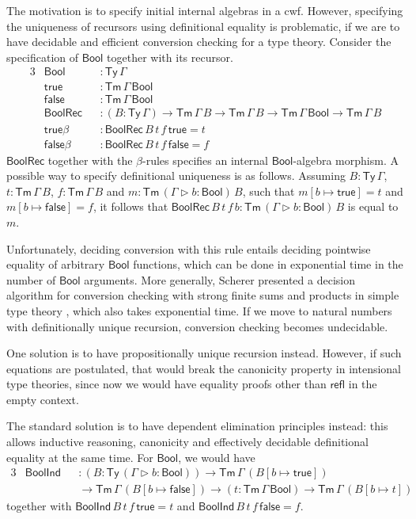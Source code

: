 \documentclass[12pt,a4paper,twoside,openany]{book}
\theoremstyle{remark}
\theoremstyle{definition}
\theoremstyle{theorem}
\newcommand{\ms}[1]{\mathsf{#1}}
\newcommand{\refl}{\mathsf{refl}}
\newcommand{\Tm}{\mathsf{Tm}}
\newcommand{\Ty}{\mathsf{Ty}}
\newcommand{\ext}{\triangleright}
\newcommand{\Bool}{\ms{Bool}}
\newcommand{\true}{\ms{true}}
\newcommand{\false}{\ms{false}}
\begin{document}
The motivation is to specify initial internal algebras in a cwf. However,
specifying the uniqueness of recursors using definitional equality is
problematic, if we are to have decidable and efficient conversion checking for a
type theory. Consider the specification of $\Bool$ together with its recursor.
\begin{alignat*}{3}
  & \Bool  &&: \Ty\,\Gamma \\
  & \true  &&: \Tm\,\Gamma\,\Bool \\
  & \false &&: \Tm\,\Gamma\,\Bool \\
  & \ms{BoolRec} &&: (B : \Ty\,\Gamma)\to \Tm\,\Gamma\,B \to \Tm\,\Gamma\,B \to \Tm\,\Gamma\,\Bool \to \Tm\,\Gamma\,B\\
  & \true\beta &&: \ms{BoolRec}\,B\,t\,f\,\true = t\\
  & \false\beta &&: \ms{BoolRec}\,B\,t\,f\,\false = f
\end{alignat*}
$\ms{BoolRec}$ together with the $\beta$-rules specifies an internal
$\Bool$-algebra morphism. A possible way to specify definitional uniqueness is
as follows. Assuming $B : \Ty\,\Gamma$, $t : \Tm\,\Gamma\,B$, $f :
\Tm\,\Gamma\,B$ and $m : \Tm\,(\Gamma\ext b : \Bool)\,B$, such that $m[b \mapsto
  \true] = t$ and $m[b \mapsto \false] = f$, it follows that
$\ms{BoolRec}\,B\,t\,f\,b : \Tm\,(\Gamma\ext b : \Bool)\,B$ is equal to $m$.

Unfortunately, deciding conversion with this rule entails deciding pointwise
equality of arbitrary $\Bool$ functions, which can be done in exponential time
in the number of $\Bool$ arguments. More generally, Scherer presented a decision
algorithm for conversion checking with strong finite sums and products in simple
type theory \cite{scherer17deciding}, which also takes exponential time. If we
move to natural numbers with definitionally unique recursion, conversion
checking becomes undecidable.

One solution is to have propositionally unique recursion instead. However, if
such equations are postulated, that would break the canonicity property in
intensional type theories, since now we would have equality proofs other than
$\refl$ in the empty context.

The standard solution is to have dependent elimination principles instead: this
allows inductive reasoning, canonicity and effectively decidable definitional
equality at the same time. For $\Bool$, we would have
\begin{alignat*}{3}
  & \ms{BoolInd} &&: (B : \Ty\,(\Gamma\ext b : \Bool)) \to \Tm\,\Gamma\,(B[b \mapsto \true])\\
  & &&\to \Tm\,\Gamma\,(B[b \mapsto \false]) \to (t : \Tm\,\Gamma\,\Bool) \to \Tm\,\Gamma\,(B[b \mapsto t])
\end{alignat*}
together with $\ms{BoolInd}\,B\,t\,f\,\true = t$ and $\ms{BoolInd}\,B\,t\,f\,\false = f$.
\end{document}
